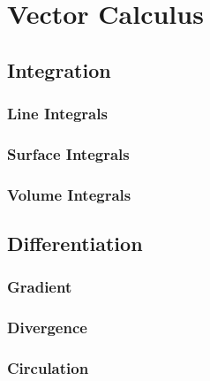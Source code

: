 \section{Vector Calculus}

\subsection{Integration}

\subsubsection{Line Integrals}

\subsubsection{Surface Integrals}

\subsubsection{Volume Integrals}

\subsection{Differentiation}

\subsubsection{Gradient}

\subsubsection{Divergence}

\subsubsection{Circulation}
